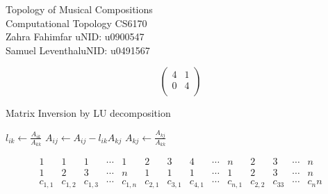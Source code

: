 \documentclass[11pt, a4paper]{article}
\begin{document}
\begin{center}
    {\Large Topology of Musical Compositions}\\
   Computational Topology \hfill CS6170\\
  Zahra Fahimfar \hfill uNID: u0900547\\
  Samuel Leventhal\hfill  uNID: u0491567
\end{center}
\iffalse
%
%
\begin{figure}[H]
\label{fig:prob1fig}
\end{figure}

%
%
\[ \begin{pmatrix}
  4 & 1 \\
  0 & 4 \\
\end{pmatrix}\]

%
%
  \begin{algorithm}[H]
\caption{Matrix Inversion by LU decomposition}
\begin{algorithmic}
              \State $l_{ik} \leftarrow \frac{A_{ik}}{A_{kk}}$ 
                        \State $A_{ij} \leftarrow A_{ij} - l_{ik}A_{kj}$ 
                    \EndFor
                    \EndIf
                    \State $A_{kj} \leftarrow \frac{A_{kj}}{A_{kk}}$ 
                    \EndFor
      \EndFor
  \EndFor
\end{algorithmic}
\end{algorithm}

%
%
  \[
  \begin{smallmatrix}
    1 & 1 & 1 & \cdots & 1 & 2 & 3 & 4 & \cdots & n & 2 & 3 & \cdots &n\\
    1 & 2 & 3 & \cdots & n & 1 & 1 & 1 & \cdots & 1 & 2 & 3 & \cdots & n\\
    c_{1,1} & c_{1,2} & c_{1,3} & \cdots & c_{1,n} & c_{2,1} & c_{3,1} & c_{4,1} & \cdots & c_{n,1} & c_{2,2} & c_33 &\cdots &c_nn\\
  \end{smallmatrix}
\]
\end{document}
